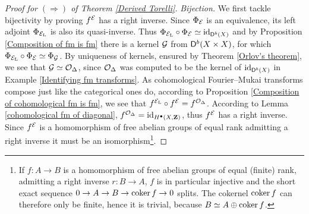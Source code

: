 \begin{proof}[Proof for $(\Rightarrow)$ of Theorem \ref{Derived Torelli}]
    \noindent
    \textsl{Bijection.}
    We first tackle bijectivity
    by proving $f^{\mathcal E}$ has a right inverse. Since $\Phi_{\mathcal E}$ is an equivalence, its left adjoint $\Phi_{\mathcal E_\mathrm{L}}$ is also its quasi-inverse. 
    Thus $\Phi_{\mathcal E_\mathrm{L}} \circ \Phi_{\mathcal E} \simeq \operatorname{id}_{\mathsf{D}^b(X)}$ and by Proposition \ref{Composition of fm is fm} there is a kernel $\mathcal G$ from $\mathsf{D}^b(X \times X)$, for which $\Phi_{\mathcal E_\mathrm{L}} \circ \Phi_{\mathcal E} \simeq \Phi_{\mathcal G}$. By uniqueness of kernels, ensured by Theorem \ref{Orlov's theorem}, we see that $\mathcal G \simeq {\mathcal{O}_{\Delta}}$, since ${\mathcal{O}_{\Delta}}$ was computed to be the kernel of $\operatorname{id}_{\mathsf{D}^b(X)}$ in Example \ref{Identifying fm transforms}. As cohomological Fourier--Mukai transforms compose just like the categorical ones do, according to Proposition \ref{Composition of cohomological fm is fm}, we see that $f^{\mathcal E_\mathrm{L}} \circ f^{\mathcal E} = f^{{\mathcal{O}_{\Delta}}}$. According to Lemma \ref{cohomological fm of diagonal}, $f^{{\mathcal{O}_{\Delta}}} = \operatorname{id}_{H^{\bullet}(X, \mathbf Z)}$, thus $f^{\mathcal E}$ has a right inverse. Since $f^{\mathcal E}$ is a homomorphism of free abelian groups of equal rank admitting a right inverse it must be an isomorphism\footnote{
        If $f \colon A \to B$ is a homomorphism of free abelian groups of equal (finite) rank, admitting a right inverse $r \colon B \to A$, $f$ is in particular injective and the short exact sequence $0 \to A \to B \to \operatorname{coker} f \to 0$ splits. The cokernel $\operatorname{coker} f$ can therefore only be finite, hence it is trivial, because $B \simeq A \oplus \operatorname{coker} f$.
    }.
    

\end{proof}
